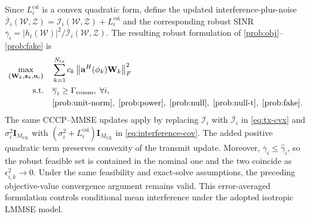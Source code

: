 \documentclass[letterpaper,journal]{IEEEtran}
\begin{document}

Since $L_i^{\mathrm{csi}}$ is a convex quadratic form, define the updated interference-plus-noise $\overline{\mathcal{I}}_i(\mathcal{W},\mathcal{Z})=\mathcal{I}_i(\mathcal{W},\mathcal{Z})+L_i^{\mathrm{csi}}$ and the corresponding robust SINR $\overline{\gamma}_i={|h_i(\mathcal{W})|^{2}}/{\overline{\mathcal{I}}_i(\mathcal{W},\mathcal{Z})}$. The resulting robust formulation of \eqref{prob:obj}--\eqref{prob:fake} is
\begin{subequations}\label{prob:robust}
\begin{align}
\max_{\{\mathbf{W}_k,\mathbf{z}_k,\mathbf{u}_i\}}\quad
& \sum_{k=1}^{N_{\mathrm{tx}}}c_k\left\|\mathbf{a}^{H}(\phi_k)\mathbf{W}_k\right\|_F^{2}\\
\text{s.t.}\quad & \overline{\gamma}_i\ge\Gamma_{\mathrm{comm}},\;\forall i,
\label{prob:robust-sinr}\\
& \eqref{prob:unit-norm},\;\eqref{prob:power},\;\eqref{prob:null},\;\eqref{prob:null-t},\;\eqref{prob:fake}.
\end{align}
\end{subequations}
The same CCCP--MMSE updates apply by replacing $\mathcal I_i$ with $\overline{\mathcal I}_i$ in \eqref{eq:tx-cvx} and $\sigma_i^2\mathbf I_{M_{\mathrm{UE}}}$ with $(\sigma_i^2+L_i^{\mathrm{csi}})\mathbf I_{M_{\mathrm{UE}}}$ in \eqref{eq:interference-cov}. The added positive quadratic term preserves convexity of the transmit update. Moreover, $\overline{\gamma}_i\le\widehat{\gamma}_i$, so the robust feasible set is contained in the nominal one and the two coincide as $\epsilon_{i,k}^2\to0$. Under the same feasibility and exact-solve assumptions, the preceding objective-value convergence argument remains valid. This error-averaged formulation controls conditional mean interference under the adopted isotropic LMMSE model. 


\end{document}
